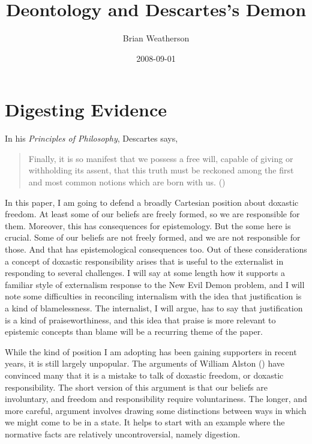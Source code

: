 \documentclass[
  11pt,
  letterpaper,
  DIV=11,
  numbers=noendperiod,
  oneside]{scrartcl}
\title{Deontology and Descartes's Demon}
\author{Brian Weatherson}
\date{2008-09-01}
\begin{document}
\maketitle
\section{Digesting Evidence}\label{digesting-evidence}

In his \emph{Principles of Philosophy}, Descartes says,

\begin{quote}
Finally, it is so manifest that we possess a free will, capable of
giving or withholding its assent, that this truth must be reckoned among
the first and most common notions which are born with us.
()
\end{quote}

In this paper, I am going to defend a broadly Cartesian position about
doxastic freedom. At least some of our beliefs are freely formed, so we
are responsible for them. Moreover, this has consequences for
epistemology. But the some here is crucial. Some of our beliefs are not
freely formed, and we are not responsible for those. And that has
epistemological consequences too. Out of these considerations a concept
of doxastic responsibility arises that is useful to the externalist in
responding to several challenges. I will say at some length how it
supports a familiar style of externalism response to the New Evil Demon
problem, and I will note some difficulties in reconciling internalism
with the idea that justification is a kind of blamelessness. The
internalist, I will argue, has to say that justification is a kind of
praiseworthiness, and this idea that praise is more relevant to
epistemic concepts than blame will be a recurring theme of the paper.

While the kind of position I am adopting has been gaining supporters in
recent years, it is still largely unpopular. The arguments of William
Alston () have convinced many that it is
a mistake to talk of doxastic freedom, or doxastic responsibility. The
short version of this argument is that our beliefs are involuntary, and
freedom and responsibility require voluntariness. The longer, and more
careful, argument involves drawing some distinctions between ways in
which we might come to be in a state. It helps to start with an example
where the normative facts are relatively uncontroversial, namely
digestion.
\end{document}
